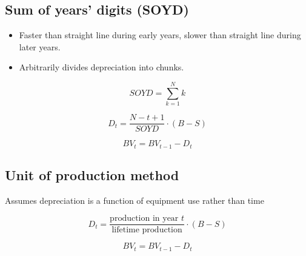 \subsection{Sum of years' digits (SOYD)}
\begin{definition}
    \begin{itemize}
        \item Faster than straight line during early years, slower than straight line during later years. 
        \item Arbitrarily divides depreciation into chunks.
    \end{itemize}
        
    \begin{equation}
    SOYD = \sum_{k=1}^{N} k
    \end{equation}
    
    \begin{equation}
    D_t = \frac{N - t + 1}{SOYD} \cdot (B - S)
    \end{equation}
    
    \begin{equation}
    BV_t = BV_{t-1} - D_t
    \end{equation}    
\end{definition}

\subsection{Unit of production method}
\begin{definition}
    Assumes depreciation is a function of equipment use rather than time

    \begin{equation}
    D_t = \frac{\text{production in year } t}{\text{lifetime production}} \cdot (B - S)
    \end{equation}

    \begin{equation}
    BV_t = BV_{t-1} - D_t
    \end{equation}
\end{definition}

